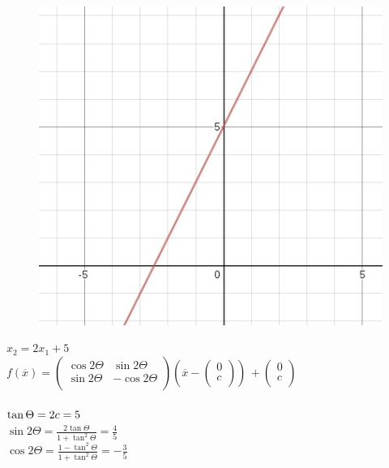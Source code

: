 \documentclass [a4paper,12pt]{article}
\begin{document}
\section{} %
\begin{figure}[h!]
  \includegraphics[width=\linewidth]{hw1-2.jpg}
\end{figure}
$x_2 = 2x_1 + 5$\\
$f({\overline{x}})= \left(
\begin{matrix}
\cos{2\Theta} & \sin{2\Theta}\\
\sin{2\Theta} & -\cos{2\Theta}\\
\end{matrix}
\right
)
\left ( {\overline{x}} -
\left(
\begin{matrix}
0\\
c\\
\end{matrix}
\right
)
\right ) \, +
\left(
\begin{matrix}
0\\
c\\
\end{matrix}
\right
)
$\\
\\
$\tan{\Theta} = 2\;\\  c = 5$\\
$\sin{2\Theta} = \frac{2\tan{\Theta}}{1+\tan^2{\Theta}}=\frac{4}{5}$\\
$\cos{2\Theta} = \frac{1-\tan^2{\Theta}}{1 + \tan^2{\Theta}} = - \frac{3}{5}$\\
\end{document}
